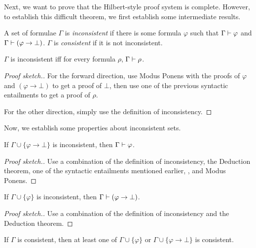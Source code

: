 \documentclass[11pt,usenames, dvipsnames]{article}
\begin{document}
Next, we want to prove that the Hilbert-style proof system is complete. However, to establish this difficult theorem, we first establish some intermediate results.

\begin{definition}
  A set of formulae $\Gamma$ is \emph{inconsistent} if there is some formula $\varphi$ such that $\Gamma \vdash \varphi$ and $\Gamma \vdash (\varphi \to \bot)$. $\Gamma$ is \emph{consistent} if it is not inconsistent.
\end{definition}

\begin{claim}
  $\Gamma$ is inconsistent iff for every formula $\rho$, $\Gamma \vdash \rho$.
\end{claim}

\begin{proof}[Proof sketch.]
  For the forward direction, use Modus Ponens with the proofs of $\varphi$ and $(\varphi \to \bot)$ to get a proof of $\bot$, then use one of the previous syntactic entailments to get a proof of $\rho$.

  For the other direction, simply use the definition of inconsistency.
\end{proof}

Now, we establish some properties about inconsistent sets.

\begin{lemma}
  If $\Gamma \cup \{\varphi \to \bot\}$ is inconsistent, then $\Gamma \vdash \varphi$.
\end{lemma}

\begin{proof}[Proof sketch.]
  Use a combination of the definition of inconsistency, the Deduction theorem, one of the syntactic entailments mentioned earlier, , and Modus Ponens.
\end{proof}

\begin{lemma}
  If $\Gamma \cup \{\varphi\}$ is inconsistent, then $\Gamma \vdash (\varphi \to \bot)$.
\end{lemma}

\begin{proof}[Proof sketch.]
  Use a combination of the definition of inconsistency and the Deduction theorem.
\end{proof}

\begin{corollary}
  If $\Gamma$ is consistent, then at least one of $\Gamma \cup \{\varphi\}$ or $\Gamma \cup \{\varphi \to \bot\}$ is consistent.
\end{corollary}
\end{document}
